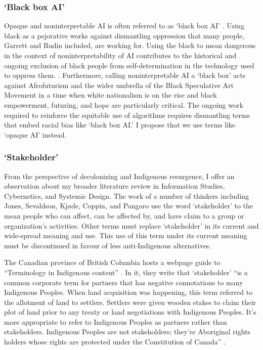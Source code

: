 \subsubsection{`Black box AI'}
Opaque and noninterpretable AI is often referred to as `black box AI' \citep{garrett_interpretable_2023}. Using black as a pejorative works against dismantling oppression that many people, Garrett and Rudin included, are working for. Using the black to mean dangerous \citep[p. 38, 138, 158]{browne_dark_2015} in the context of noninterpretability of AI contributes to the historical and ongoing exclusion of black people from self-determination in the technology used to oppress them. \citep[p. 244-245]{mcilwain_black_2020}. Furthermore, calling noninterpretable AI a `black box' acts against Afrofuturism and the wider umbrella of the Black Speculative Art Movement \citep[p. 233]{anderson_afrofuturism_2016} in a time when white nationalism is on the rise and black empowerment, futuring, and hope are particularly critical. The ongoing work required to reinforce the equitable use of algorithms \citep{noble_algorithms_2018} requires dismantling terms that embed racial bias like `black box AI.' I propose that we use terms like `opaque AI' instead.

\subsubsection{`Stakeholder’}
From the perspective of decolonizing and Indigenous resurgence, I offer an observation about my broader literature review in Information Studies, Cybernetics, and Systemic Design. The work of a number of thinkers including Jones, Sevaldson, Kjøde, Coppin, and Pangaro use the word `stakeholder’ to the mean people who can affect, can be affected by, and have claim to a group or organization’s activities. Other terms must replace `stakeholder’ in its current and wide-spread meaning and use.  This use of this term under its current meaning must be discontinued in favour of less anti-Indigenous alternatives. 

The Canadian province of British Columbia hosts a webpage guide to ``Terminology in Indigenous content” \citep{province_of_british_columbia_terminology_2024}. In it, they write that `stakeholder’ ``is a common corporate term for partners that has negative connotations to many Indigenous Peoples. When land acquisition was happening, this term referred to the allotment of land to settlers. Settlers were given wooden stakes to claim their plot of land prior to any treaty or land negotiations with Indigenous Peoples. It's more appropriate to refer to Indigenous Peoples as partners rather than stakeholders. Indigenous Peoples are not stakeholders; they're Aboriginal rights holders whose rights are protected under the Constitution of Canada” \citep{province_of_british_columbia_terminology_2024}.

